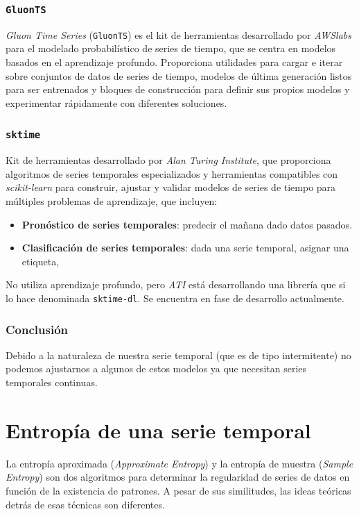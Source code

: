 \documentclass[a4paper,12pt]{article}
\begin{document}
\subsubsection{\texttt{GluonTS}}
\textit{Gluon Time Series} (\texttt{GluonTS}) es el kit de herramientas desarrollado por \textit{AWSlabs} para el modelado probabilístico de series de tiempo, que se centra en modelos basados ​​en el aprendizaje profundo. Proporciona utilidades para cargar e iterar sobre conjuntos de datos de series de tiempo, modelos de última generación listos para ser entrenados y bloques de construcción para definir sus propios modelos y experimentar rápidamente con diferentes soluciones. \citep{gluonts}

\subsubsection{\texttt{sktime}}
Kit de herramientas desarrollado por \textit{Alan Turing Institute}, que proporciona algoritmos de series temporales especializados y herramientas compatibles con \textit{scikit-learn} para construir, ajustar y validar modelos de series de tiempo para múltiples problemas de aprendizaje, que incluyen: \citep{sktime}

\begin{itemize}
	\item \textbf{Pronóstico de series temporales}: predecir el mañana dado datos pasados.
	\item \textbf{Clasificación de series temporales}: dada una serie temporal, asignar una etiqueta,
\end{itemize}

No utiliza aprendizaje profundo, pero \textit{ATI} está desarrollando una librería que si lo hace denominada \texttt{sktime-dl}. Se encuentra en fase de desarrollo actualmente.

\subsubsection{Conclusión}

Debido a la naturaleza de nuestra serie temporal (que es de tipo intermitente) no podemos ajustarnos a algunos de estos modelos ya que necesitan series temporales continuas.

\section{Entropía de una serie temporal} \label{sec:entropy}
La entropía aproximada (\textit{Approximate Entropy}) y la entropía de muestra (\textit{Sample Entropy}) son dos algoritmos para determinar la regularidad de series de datos en función de la existencia de patrones. A pesar de sus similitudes, las ideas teóricas detrás de esas técnicas son diferentes. \citep{delgado2019approximate}
\end{document}
